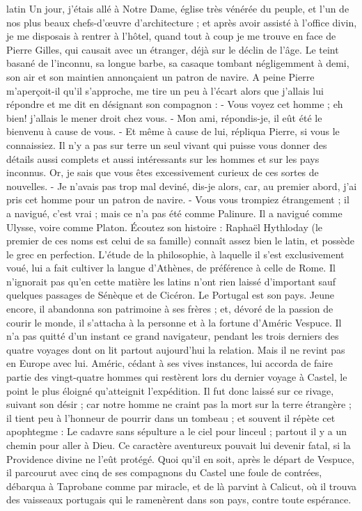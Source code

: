 \documentclass[12pt,a4paper]{book}
\renewenvironment{latin}
    	{\begin{hyphenrules}{latin}}
    	{\end{hyphenrules}}
\begin{document}
\begin{pairs}
\begin{Leftside}
\begin{latin}
		\pend
		\pstart
        Un jour, j'étais allé à Notre Dame, église très vénérée du peuple, et l'un de nos plus beaux chefs-d'œuvre d'architecture ; et après avoir assisté à l'office divin, je me disposais à rentrer à l'hôtel, quand tout à coup je me trouve en face de Pierre Gilles, qui causait avec un étranger, déjà sur le déclin de l'âge. Le teint basané de l'inconnu, sa longue barbe, sa casaque tombant négligemment à demi, son air et son maintien annonçaient un patron de navire. A peine Pierre m'aperçoit-il qu'il s'approche, me tire un peu à l'écart alors que j'allais lui répondre et me dit en désignant son compagnon : - Vous voyez cet homme ; eh bien! j'allais le mener droit chez vous. - Mon ami, répondis-je, il eût été le bienvenu à cause de vous. - Et même à cause de lui, répliqua Pierre, si vous le connaissiez. Il n'y a pas sur terre un seul vivant qui puisse vous donner des détails aussi complets et aussi intéressants sur les hommes et sur les pays inconnus. Or, je sais que vous êtes excessivement curieux de ces sortes de nouvelles. - Je n'avais pas trop mal deviné, dis-je alors, car, au premier abord, j'ai pris cet homme pour un patron de navire. - Vous vous trompiez étrangement ; il a navigué, c'est vrai ; mais ce n'a pas été comme Palinure. Il a navigué comme Ulysse, voire comme Platon.
		\pend
		\pstart
        Écoutez son histoire : Raphaël Hythloday (le premier de ces noms est celui de sa famille) connaît assez bien le latin, et possède le grec en perfection. L'étude de la philosophie, à laquelle il s'est exclusivement voué, lui a fait cultiver la langue d'Athènes, de préférence à celle de Rome. Il n'ignorait pas qu'en cette matière les latins n'ont rien laissé d'important sauf quelques passages de Sénèque et de Cicéron. Le Portugal est son pays. Jeune encore, il abandonna son patrimoine à ses frères ; et, dévoré de la passion de courir le monde, il s'attacha à la personne et à la fortune d'Améric Vespuce. Il n'a pas quitté d'un instant ce grand navigateur, pendant les trois derniers des quatre voyages dont on lit partout aujourd'hui la relation. Mais il ne revint pas en Europe avec lui. Améric, cédant à ses vives instances, lui accorda de faire partie des vingt-quatre hommes qui restèrent lors du dernier voyage à Castel, le point le plus éloigné qu'atteignit l'expédition. Il fut donc laissé sur ce rivage, suivant son désir ; car notre homme ne craint pas la mort sur la terre étrangère ; il tient peu à l'honneur de pourrir dans un tombeau ; et souvent il répète cet apophtegme : Le cadavre sans sépulture a le ciel pour linceul ; partout il y a un chemin pour aller à Dieu. Ce caractère aventureux pouvait lui devenir fatal, si la Providence divine ne l'eût protégé.
        \pend
        \pstart
        Quoi qu'il en soit, après le départ de Vespuce, il parcourut avec cinq de ses compagnons du Castel une foule de contrées, débarqua à Taprobane comme par miracle, et de là parvint à Calicut, où il trouva des vaisseaux portugais qui le ramenèrent dans son pays, contre toute espérance.
        \pend
        \endnumbering
    \end{latin}
    \end{Leftside}


\end{pairs}
\end{document}
